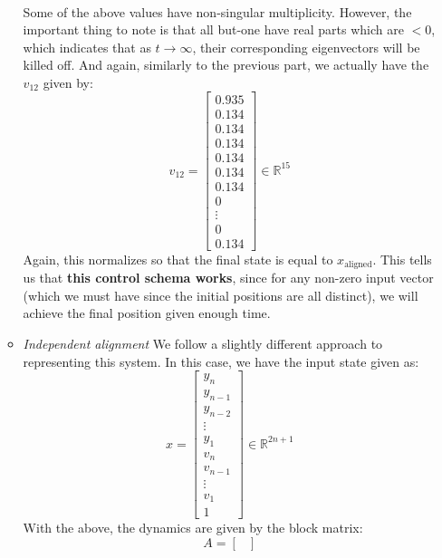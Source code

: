 \documentclass[12pt]{exam}
\begin{document}
\begin{questions}
\begin{solution}
\begin{enumerate}[label=(\alph*)]
\begin{itemize}
\begin{align*}
          \end{align*}
          Some of the above values have non-singular multiplicity. However, the important thing to note is that all but-one have real parts which are $< 0$, which indicates that as $t \to \infty$, their corresponding eigenvectors will be killed off. And again, similarly to the previous part, we actually have the $v_{12}$ given by:
          \[
            v_{12} =
              \begin{bmatrix}
                0.935 \\
                0.134 \\
                0.134 \\
                0.134 \\
                0.134 \\
                0.134 \\
                0.134 \\
                0 \\
                \vdots \\
                0 \\
                0.134
              \end{bmatrix} \in \mathbb{R}^{15}
          \]
          Again, this normalizes so that the final state is equal to $x_{\text{aligned}}$. This tells us that \textbf{this control schema works}, since for any non-zero input vector (which we must have since the initial positions are all distinct), we will achieve the final position given enough time.
        \item \textit{Independent alignment}
          We follow a slightly different approach to representing this system. In this case, we have the input state given as:
          \[
            x =
              \begin{bmatrix}
                y_n \\ y_{n-1} \\ y_{n-2} \\ \vdots \\ y_1 \\ v_n \\ v_{n-1} \\ \vdots \\ v_1 \\ 1
              \end{bmatrix} \in \mathbb{R}^{2n + 1}
          \]
          With the above, the dynamics are given by the block matrix:
          \[
            A =
              \begin{bmatrix}

\end{bmatrix}\]
\end{itemize}
\end{enumerate}
\end{solution}
\end{questions}
\end{document}
